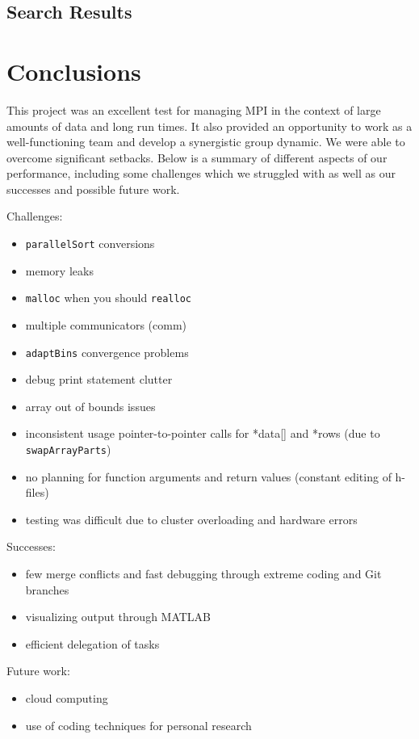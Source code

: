 \documentclass{article}
\begin{document}
\subsection{Search Results}



\section{Conclusions}
This project was an excellent test for managing MPI in the context of large amounts of data and long run times. It also provided an opportunity to work as a well-functioning team and develop a synergistic group dynamic. We were able to overcome significant setbacks. Below is a summary of different aspects of our performance, including some challenges which we struggled with as well as our successes and possible future work.

\begin{mdframed}[backgroundcolor=red!20]
	Challenges:
	\begin{itemize}
		\item \texttt{parallelSort} conversions
		\item memory leaks
		\item \texttt{malloc} when you should \texttt{realloc}
		\item multiple communicators (comm)
		\item \texttt{adaptBins} convergence problems
		\item debug print statement clutter
		\item array out of bounds issues
		\item inconsistent usage pointer-to-pointer calls for *data[] and *rows (due to \texttt{swapArrayParts})
		\item no planning for function arguments and return values (constant editing of h-files)
		\item testing was difficult due to cluster overloading and hardware errors
	\end{itemize}
\end{mdframed}

\begin{mdframed}[backgroundcolor=green!20]
	Successes:
	\begin{itemize}
		\item few merge conflicts and fast debugging through extreme coding and Git branches
		\item visualizing output through MATLAB
		\item efficient delegation of tasks
	\end{itemize}
\end{mdframed}

\begin{mdframed}[backgroundcolor=blue!20]
	Future work:
	\begin{itemize}
		\item cloud computing
		\item use of coding techniques for personal research
	\end{itemize}
\end{mdframed}






\end{document}
